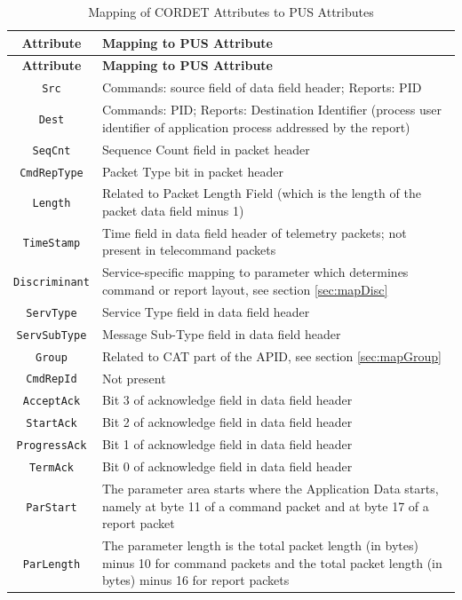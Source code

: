 \documentclass[a4paper,10pt]{article}
\begin{document}
\begin{longtable}{|c|>{\raggedright\arraybackslash}p{11cm}|}
\caption{Mapping of CORDET Attributes to PUS Attributes}\label{tab:pcktAttPus} \\
\hline
\rowcolor{light-gray}
\textbf{Attribute} & \textbf{Mapping to PUS Attribute} \\
\hline\hline
\endfirsthead
\rowcolor{light-gray}
\textbf{Attribute} & \textbf{Mapping to PUS Attribute} \\
\hline\hline
\endhead
\texttt{Src} & Commands: source field of data field header; Reports: PID \\
\hline
\texttt{Dest} & Commands: PID; Reports: Destination Identifier (process user identifier of application process addressed by the report)  \\
\hline
\texttt{SeqCnt} & Sequence Count field in packet header \\
\hline
\texttt{CmdRepType} & Packet Type bit in packet header \\
\hline
\texttt{Length} & Related to Packet Length Field (which is the length of the packet data field minus 1) \\
\hline
\texttt{TimeStamp} & Time field in data field header of telemetry packets; not present in telecommand packets \\
\hline
\texttt{Discriminant} & Service-specific mapping to parameter which determines command or report layout, see section \ref{sec:mapDisc} \\
\hline
\texttt{ServType} & Service Type field in data field header \\
\hline
\texttt{ServSubType} & Message Sub-Type field in data field header \\
\hline
\texttt{Group} & Related to CAT part of the APID, see section \ref{sec:mapGroup} \\
\hline
\texttt{CmdRepId} & Not present \\
\hline
\texttt{AcceptAck} & Bit 3 of acknowledge field in data field header \\
\hline
\texttt{StartAck} & Bit 2 of acknowledge field in data field header \\
\hline
\texttt{ProgressAck} & Bit 1 of acknowledge field in data field header \\
\hline
\texttt{TermAck} & Bit 0 of acknowledge field in data field header \\
\hline
\texttt{ParStart} & The parameter area starts where the Application Data starts, namely at byte 11 of a command packet and at byte 17 of a report packet \\
\hline
\texttt{ParLength} & The parameter length is the total packet length (in bytes) minus 10 for command packets and the total packet length (in bytes) minus 16 for report packets \\
\hline
\end{longtable}  
\end{document}
